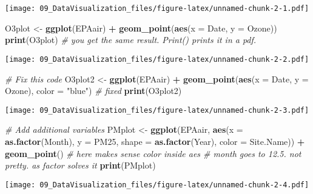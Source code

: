 \documentclass[]{article}
\newenvironment{Shaded}{\begin{snugshade}}{\end{snugshade}}
\newcommand{\KeywordTok}[1]{\textcolor[rgb]{0.13,0.29,0.53}{\textbf{#1}}}
\newcommand{\DataTypeTok}[1]{\textcolor[rgb]{0.13,0.29,0.53}{#1}}
\newcommand{\StringTok}[1]{\textcolor[rgb]{0.31,0.60,0.02}{#1}}
\newcommand{\CommentTok}[1]{\textcolor[rgb]{0.56,0.35,0.01}{\textit{#1}}}
\newcommand{\OperatorTok}[1]{\textcolor[rgb]{0.81,0.36,0.00}{\textbf{#1}}}
\newcommand{\NormalTok}[1]{#1}
\begin{document}
\texttt{[image: 09\_DataVisualization\_files/figure-latex/unnamed-chunk-2-1.pdf]}

\begin{Shaded}
\begin{Highlighting}[]
\NormalTok{O3plot <-}\StringTok{ }\KeywordTok{ggplot}\NormalTok{(EPAair) }\OperatorTok{+}
\StringTok{  }\KeywordTok{geom_point}\NormalTok{(}\KeywordTok{aes}\NormalTok{(}\DataTypeTok{x =}\NormalTok{ Date, }\DataTypeTok{y =}\NormalTok{ Ozone))}
\KeywordTok{print}\NormalTok{(O3plot) }\CommentTok{# you get the same result. Print() prints it in a pdf.}
\end{Highlighting}
\end{Shaded}

\texttt{[image: 09\_DataVisualization\_files/figure-latex/unnamed-chunk-2-2.pdf]}

\begin{Shaded}
\begin{Highlighting}[]
\CommentTok{# Fix this code}
\NormalTok{O3plot2 <-}\StringTok{ }\KeywordTok{ggplot}\NormalTok{(EPAair) }\OperatorTok{+}
\StringTok{  }\KeywordTok{geom_point}\NormalTok{(}\KeywordTok{aes}\NormalTok{(}\DataTypeTok{x =}\NormalTok{ Date, }\DataTypeTok{y =}\NormalTok{ Ozone), }\DataTypeTok{color =} \StringTok{"blue"}\NormalTok{) }\CommentTok{# fixed}
\KeywordTok{print}\NormalTok{(O3plot2)}
\end{Highlighting}
\end{Shaded}

\texttt{[image: 09\_DataVisualization\_files/figure-latex/unnamed-chunk-2-3.pdf]}

\begin{Shaded}
\begin{Highlighting}[]
\CommentTok{# Add additional variables}
\NormalTok{PMplot <-}\StringTok{ }
\StringTok{  }\KeywordTok{ggplot}\NormalTok{(EPAair, }\KeywordTok{aes}\NormalTok{(}\DataTypeTok{x =} \KeywordTok{as.factor}\NormalTok{(Month), }\DataTypeTok{y =}\NormalTok{ PM25, }\DataTypeTok{shape =} \KeywordTok{as.factor}\NormalTok{(Year), }\DataTypeTok{color =}\NormalTok{ Site.Name)) }\OperatorTok{+}
\StringTok{  }\KeywordTok{geom_point}\NormalTok{() }\CommentTok{# here makes sense color inside aes # month goes to 12.5. not pretty. as factor solves it }
\KeywordTok{print}\NormalTok{(PMplot)}
\end{Highlighting}
\end{Shaded}

\texttt{[image: 09\_DataVisualization\_files/figure-latex/unnamed-chunk-2-4.pdf]}
\end{document}
